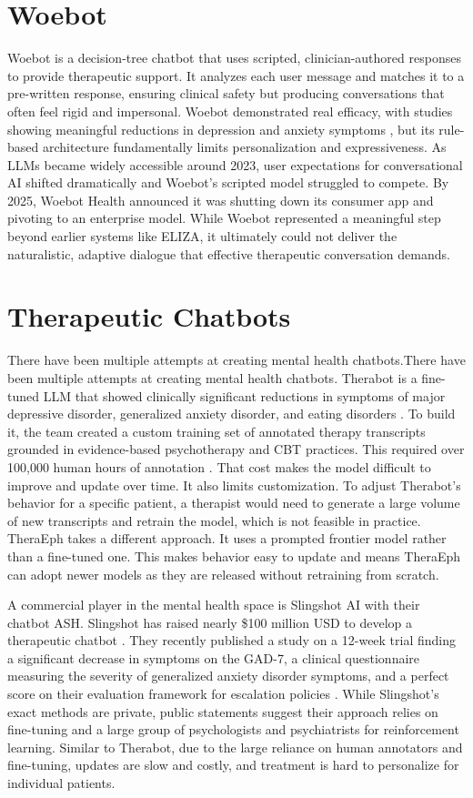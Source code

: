 \documentclass[twoside]{report}
\begin{document}
\section{Woebot}
Woebot is a decision-tree chatbot that uses scripted, clinician-authored responses to provide therapeutic support. It analyzes each user message and matches it to a pre-written response, ensuring clinical safety but producing conversations that often feel rigid and impersonal. Woebot demonstrated real efficacy, with studies showing meaningful reductions in depression and anxiety symptoms \cite{fitzpatrick2017woebot}, but its rule-based architecture fundamentally limits personalization and expressiveness. As LLMs became widely accessible around 2023, user expectations for conversational AI shifted dramatically and Woebot's scripted model struggled to compete. By 2025, Woebot Health announced it was shutting down its consumer app and pivoting to an enterprise model. While Woebot represented a meaningful step beyond earlier systems like ELIZA, it ultimately could not deliver the naturalistic, adaptive dialogue that effective therapeutic conversation demands.

\section{Therapeutic Chatbots}
There have been multiple attempts at creating mental health chatbots.There have been multiple attempts at creating mental health chatbots. Therabot is a fine-tuned LLM that showed clinically significant reductions in symptoms of major depressive disorder, generalized anxiety disorder, and eating disorders \cite{heinz2025therabot}. To build it, the team created a custom training set of annotated therapy transcripts grounded in evidence-based psychotherapy and CBT practices. This required over 100,000 human hours of annotation \cite{heinz2025therabot}. That cost makes the model difficult to improve and update over time. It also limits customization. To adjust Therabot's behavior for a specific patient, a therapist would need to generate a large volume of new transcripts and retrain the model, which is not feasible in practice. TheraEph takes a different approach. It uses a prompted frontier model rather than a fine-tuned one. This makes behavior easy to update and means TheraEph can adopt newer models as they are released without retraining from scratch.

A commercial player in the mental health space is Slingshot AI with their chatbot ASH. Slingshot has raised nearly \$100 million USD to develop a therapeutic chatbot \cite{aguilar2025slingshot}. They recently published a study on a 12-week trial finding a significant decrease in symptoms on the GAD-7, a clinical questionnaire measuring the severity of generalized anxiety disorder symptoms, and a perfect score on their evaluation framework for escalation policies \cite{hull2025mentalhealth}. While Slingshot's exact methods are private, public statements suggest their approach relies on fine-tuning and a large group of psychologists and psychiatrists for reinforcement learning. Similar to Therabot, due to the large reliance on human annotators and fine-tuning, updates are slow and costly, and treatment is hard to personalize for individual patients.
\end{document}
